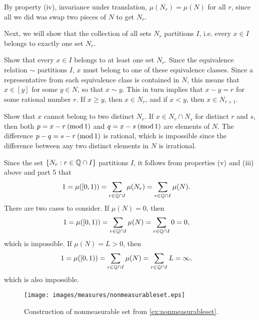 \documentclass[main.tex]{subfiles}
\begin{document}
\begin{example}
\begin{remunerate}
	\item By property (iv), invariance under translation, $\mu(N_r) = \mu(N)$ for all $r$, since all we did was swap two pieces of $N$ to get $N_r$.
	\item Next, we will show that the collection of all sets $N_r$ partitions $I$, i.e. every $x \in I$ belongs to exactly one set $N_r$. 
	\begin{bulletlist} 
	\item Show that every $x \in I$ belongs to at least one set $N_r$. Since the equivalence relation $\sim$ partitions $I$, $x$ must belong to one of these equivalence classes. Since a representative from each equivalence class is contained in $N$, this means that $x \in [y]$ for some $y \in N$, so that $x \sim y$. This in turn implies that $x - y = r$ for some rational number $r$. If $x \geq y$, then $x \in N_r$, and if $x < y$, then $x \in N_{r+1}$.
	\item Show that $x$ cannot belong to two distinct $N_r$. If $x \in N_r \cap N_s$ for distinct $r$ and $s$, then both $p = x - r\:(\operatorname{mod} 1)$ and $q = x - s\:(\operatorname{mod} 1)$ are elements of $N$. The difference $p - q = s - r\:(\operatorname{mod} 1)$ is rational, which is impossible since the difference between any two distinct elements in $N$ is irrational.
	\end{bulletlist}
	\item Since the set $\{ N_r : r \in \mathbb{Q} \cap I \}$ partitions $I$, it follows from properties (v) and (iii) above and part 5 that
	\begin{align*}
	1 = \mu( [0, 1) ) &= \sum_{r \in \mathbb{Q} \cap I} \mu(N_r) = \sum_{r \in \mathbb{Q} \cap I} \mu(N).
	\end{align*}
	There are two cases to consider. If $\mu(N) = 0$, then
	\begin{align*}
	1 = \mu( [0, 1) ) &= \sum_{r \in \mathbb{Q} \cap I} \mu(N) = \sum_{r \in \mathbb{Q} \cap I} 0 = 0,
	\end{align*}
	which is impossible. If $\mu(N) = L > 0$, then
	\begin{align*}
	1 = \mu( [0, 1) ) &= \sum_{r \in \mathbb{Q} \cap I} \mu(N) = \sum_{r \in \mathbb{Q} \cap I} L = \infty,
	\end{align*}
	which is also impossible.
\end{remunerate}
\end{example}

	\begin{figure}
	\centerline{\texttt{[image: images/measures/nonmeasurableset.eps]}}
	\caption{Construction of nonmeasurable set from \cref{ex:nonmeasurableset}.}
	\label{fig:nonmeasurableset}
	\end{figure}
\end{document}
